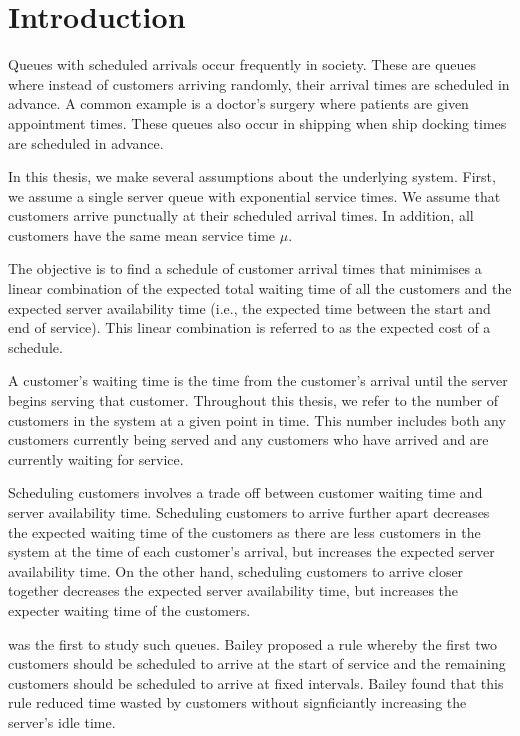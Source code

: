 \chapter{Introduction}
Queues with scheduled arrivals occur frequently in society. These are queues where instead of customers arriving randomly, their arrival times are scheduled in advance. A common example is a doctor's surgery where patients are given appointment times. These queues also occur in shipping when ship docking times are scheduled in advance.

In this thesis, we make several assumptions about the underlying system. First, we assume a single server queue with exponential service times. We assume that customers arrive punctually at their scheduled arrival times. In addition, all customers have the same mean service time $\mu$.

The objective is to find a schedule of customer arrival times that minimises a linear combination of the expected total waiting time of all the customers and the expected server availability time (i.e., the expected time between the start and end of service). This linear combination is referred to as the expected cost of a schedule.

A customer's waiting time is the time from the customer's arrival until the server begins serving that customer. Throughout this thesis, we refer to the number of customers in the system at a given point in time. This number includes both any customers currently being served and any customers who have arrived and are currently waiting for service.

Scheduling customers involves a trade off between customer waiting time and server availability time. Scheduling customers to arrive further apart decreases the expected waiting time of the customers as there are less customers in the system at the time of each customer's arrival, but increases the expected server availability time. On the other hand, scheduling customers to arrive closer together decreases the expected server availability time, but increases the expecter waiting time of the customers.

\citet{Bailey} was the first to study such queues. Bailey proposed a rule whereby the first two customers should be scheduled to arrive at the start of service and the remaining customers should be scheduled to arrive at fixed intervals. Bailey found that this rule reduced time wasted by customers without signficiantly increasing the server's idle time.

